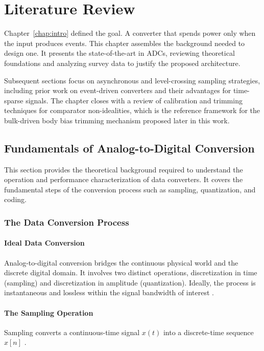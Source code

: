 
\chapter{Literature Review} \label{chap:lit_review}
Chapter~\ref{chap:intro} defined the goal. A converter that spends power only when the input produces events. This chapter assembles the background needed to design one. It presents the state-of-the-art in ADCs, reviewing theoretical foundations and analyzing survey data to justify the proposed architecture.

Subsequent sections focus on asynchronous and level-crossing sampling strategies, including prior work on event-driven converters and their advantages for time-sparse signals. The chapter closes with a review of calibration and trimming techniques for comparator non-idealities, which is the reference framework for the bulk-driven body bias trimming mechanism proposed later in this work.

\section{Fundamentals of Analog-to-Digital Conversion} \label{sec:ADC_fundamentals}

This section provides the theoretical background required to understand the operation and performance characterization of data converters. It covers the fundamental steps of the conversion process such as sampling, quantization, and coding.

\subsection{The Data Conversion Process}

\subsubsection{Ideal Data Conversion}
Analog-to-digital conversion bridges the continuous physical world and the discrete digital domain. It involves two distinct operations, discretization in time (sampling) and discretization in amplitude (quantization). Ideally, the process is instantaneous and lossless within the signal bandwidth of interest \cite{johns_martin_2012}.

\subsubsection{The Sampling Operation}
Sampling converts a continuous-time signal $x(t)$ into a discrete-time sequence $x[n]$ \cite{johns_martin_2012}.

